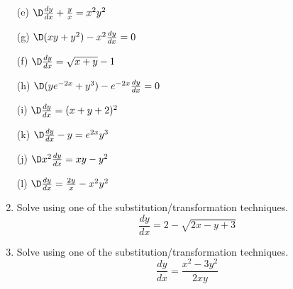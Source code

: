 \documentclass[12pt]{amsart}
\numberwithin{equation}{section}
\begin{document}
\begin{enumerate}[1.]
\newpage
\thispagestyle{empty}

\begin{multicols}{2}
	\begin{enumerate}
	\item[(e)]  $\D \frac{dy}{dx} + \frac{y}{x} = x^2y^2$\\ \vspace{11.2cm}
	\item[(g)]  $\D (xy + y^2) - x^2\frac{dy}{dx} = 0$\\ \vspace{11.2cm}
	\item[(f)]  $\D \frac{dy}{dx} = \sqrt{x+y} - 1$\\ \vspace{11.2cm}
	\item[(h)]  $\D (y e^{-2x} + y^3) - e^{-2x}\frac{dy}{dx} = 0$\\ \vspace{11.2cm}
	\end{enumerate}
\end{multicols}

\newpage
\thispagestyle{empty}

\begin{multicols}{2}
	\begin{enumerate}
	\item[(i)]  $\D \frac{dy}{dx} = (x + y + 2)^2$\\ \vspace{11.2cm}
	\item[(k)]  $\D \frac{dy}{dx} - y = e^{2x}y^3$\\ \vspace{11.2cm}
	\item[(j)]  $\D x^2 \frac{dy}{dx} = xy - y^2$\\ \vspace{11.2cm}
	\item[(l)]  $\D \frac{dy}{dx} = \frac{2y}{x} - x^2 y^2$\\ \vspace{11.2cm}
	\end{enumerate}
\end{multicols}
\end{enumerate}

\newpage
\thispagestyle{empty}

\begin{enumerate}[1.]
\setcounter{enumi}{1}
\item    Solve using one of the substitution/transformation techniques.
		\[ \frac{dy}{dx} = 2 - \sqrt{2x - y + 3} \]

\newpage
\thispagestyle{empty}

\item    Solve using one of the substitution/transformation techniques.
		\[ \frac{dy}{dx} = \frac{x^2 - 3y^2}{2xy} \]
\end{enumerate}
\end{document}
